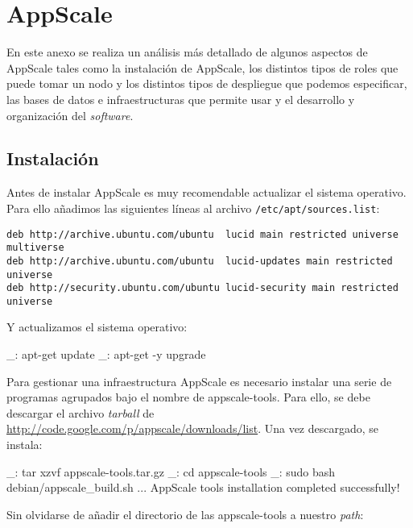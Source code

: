 \chapter{AppScale}
\label{anx:appscale}


En este anexo se realiza un análisis más detallado de algunos aspectos de AppScale tales como la instalación de AppScale, los distintos tipos de roles que puede tomar un nodo y los distintos tipos de despliegue que podemos especificar, las bases de datos e infraestructuras que permite usar y el desarrollo y organización del \emph{software}.


\section{Instalación}

Antes de instalar AppScale es muy recomendable actualizar el sistema operativo. Para ello añadimos las siguientes líneas al archivo \texttt{/etc/apt/sources.list}:

\begin{lstlisting}
deb http://archive.ubuntu.com/ubuntu  lucid main restricted universe multiverse
deb http://archive.ubuntu.com/ubuntu  lucid-updates main restricted universe
deb http://security.ubuntu.com/ubuntu lucid-security main restricted universe
\end{lstlisting}

Y actualizamos el sistema operativo:

\begin{bashcode}
_: apt-get update
_: apt-get -y upgrade
\end{bashcode}

Para gestionar una infraestructura AppScale es necesario instalar una serie de programas agrupados bajo el nombre de appscale-tools. Para ello, se debe descargar el archivo \emph{tarball} de \url{http://code.google.com/p/appscale/downloads/list}. Una vez descargado, se instala:

\begin{bashcode}
_: tar xzvf appscale-tools.tar.gz
_: cd appscale-tools
_: sudo bash debian/appscale_build.sh
...
AppScale tools installation completed successfully!
\end{bashcode}

Sin olvidarse de añadir el directorio de las appscale-tools a nuestro \emph{path}:


